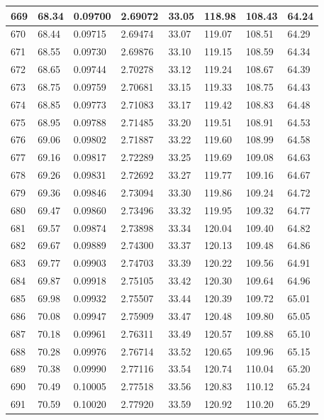 \documentclass[12pt,a4paper,twoside]{article}
\begin{document}
\begin{center}
\begin{longtable}{l l l l | l l l l}
669 & 68.34 & 0.09700 & 2.69072 & 33.05 & 118.98 & 108.43 & 64.24 \\ \hline
670 & 68.44 & 0.09715 & 2.69474 & 33.07 & 119.07 & 108.51 & 64.29 \\ \hline
671 & 68.55 & 0.09730 & 2.69876 & 33.10 & 119.15 & 108.59 & 64.34 \\ \hline
672 & 68.65 & 0.09744 & 2.70278 & 33.12 & 119.24 & 108.67 & 64.39 \\ \hline
673 & 68.75 & 0.09759 & 2.70681 & 33.15 & 119.33 & 108.75 & 64.43 \\ \hline
674 & 68.85 & 0.09773 & 2.71083 & 33.17 & 119.42 & 108.83 & 64.48 \\ \hline
675 & 68.95 & 0.09788 & 2.71485 & 33.20 & 119.51 & 108.91 & 64.53 \\ \hline
676 & 69.06 & 0.09802 & 2.71887 & 33.22 & 119.60 & 108.99 & 64.58 \\ \hline
677 & 69.16 & 0.09817 & 2.72289 & 33.25 & 119.69 & 109.08 & 64.63 \\ \hline
678 & 69.26 & 0.09831 & 2.72692 & 33.27 & 119.77 & 109.16 & 64.67 \\ \hline
679 & 69.36 & 0.09846 & 2.73094 & 33.30 & 119.86 & 109.24 & 64.72 \\ \hline
680 & 69.47 & 0.09860 & 2.73496 & 33.32 & 119.95 & 109.32 & 64.77 \\ \hline
681 & 69.57 & 0.09874 & 2.73898 & 33.34 & 120.04 & 109.40 & 64.82 \\ \hline
682 & 69.67 & 0.09889 & 2.74300 & 33.37 & 120.13 & 109.48 & 64.86 \\ \hline
683 & 69.77 & 0.09903 & 2.74703 & 33.39 & 120.22 & 109.56 & 64.91 \\ \hline
684 & 69.87 & 0.09918 & 2.75105 & 33.42 & 120.30 & 109.64 & 64.96 \\ \hline
685 & 69.98 & 0.09932 & 2.75507 & 33.44 & 120.39 & 109.72 & 65.01 \\ \hline
686 & 70.08 & 0.09947 & 2.75909 & 33.47 & 120.48 & 109.80 & 65.05 \\ \hline
687 & 70.18 & 0.09961 & 2.76311 & 33.49 & 120.57 & 109.88 & 65.10 \\ \hline
688 & 70.28 & 0.09976 & 2.76714 & 33.52 & 120.65 & 109.96 & 65.15 \\ \hline
689 & 70.38 & 0.09990 & 2.77116 & 33.54 & 120.74 & 110.04 & 65.20 \\ \hline
690 & 70.49 & 0.10005 & 2.77518 & 33.56 & 120.83 & 110.12 & 65.24 \\ \hline
691 & 70.59 & 0.10020 & 2.77920 & 33.59 & 120.92 & 110.20 & 65.29 \\ \hline

\end{longtable}
\end{center}
\end{document}
